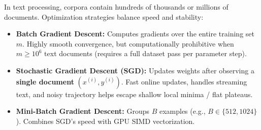 \documentclass[10pt,a4paper]{article}
\begin{document}
\par\vspace{1pt}
In text processing, corpora contain hundreds of thousands or millions of documents. Optimization strategies balance speed and stability:
\begin{itemize}[leftmargin=12pt, itemsep=0.5pt, parsep=0pt, topsep=0.5pt]
    \item \textbf{Batch Gradient Descent:} Computes gradients over the entire training set $m$. Highly smooth convergence, but computationally prohibitive when $m \ge 10^6$ text documents (requires a full dataset pass per parameter step).
    \item \textbf{Stochastic Gradient Descent (SGD):} Updates weights after observing a \textbf{single document} $(x^{(i)}, y^{(i)})$. Fast online updates, handles streaming text, and noisy trajectory helps escape shallow local minima / flat plateaus.
    \item \textbf{Mini-Batch Gradient Descent:} Groups $B$ examples (e.g., $B \in \{512, 1024\}$). Combines SGD's speed with GPU SIMD vectorization.
\end{itemize}
\vspace{2pt}
\end{document}
